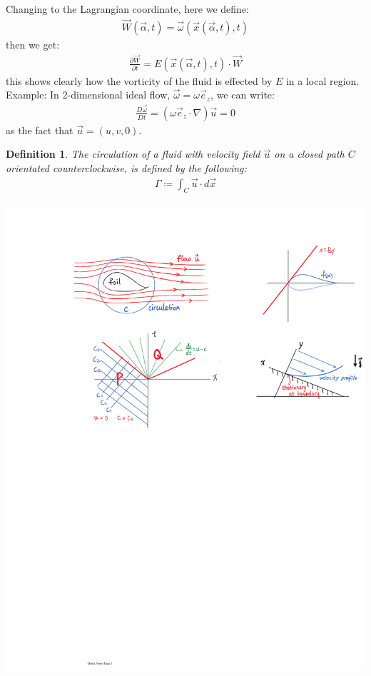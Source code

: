 \documentclass[11pt]{book}
\theoremstyle{break}
\theoremstyle{break}
\newtheorem{defn}{Definition}[corL]
\newcommand{\example}{\color{green}Example: \color{black}}
\begin{document}
Changing to the Lagrangian coordinate, here we define:
\begin{align*}
\vec{W}(\vec{\alpha},t) = \vec{\omega}(\vec{x}(\vec{\alpha},t),t)
\end{align*}
then we get:
\begin{align*}
\frac{\partial \vec{W}}{\partial t} = E(\vec{x}(\vec{\alpha},t),t)\cdot \vec{W}
\end{align*}
this shows clearly how the vorticity of the fluid is effected by $E$ in a local region.\\

\example In $2$-dimensional ideal flow, $\vec{\omega} = \omega \vec{e}_z$, we can write:
\begin{align*}
\frac{D\vec{\omega}}{Dt} = (\omega\vec{e}_z \cdot \nabla) \vec{u} = 0
\end{align*}
as the fact that $\vec{u} = (u,v,0)$.\\

\newpage
\begin{defn}
The circulation of a fluid with velocity field $\vec{u}$ on a closed path $C$ orientated counterclockwise, is defined by the following:
\begin{align}
\Gamma \coloneqq \int_C \vec{u} \cdot d\vec{x}
\end{align}
\end{defn}
\begin{center}
\includegraphics[scale=1.19]{circulation.pdf}
\end{center}
\end{document}
